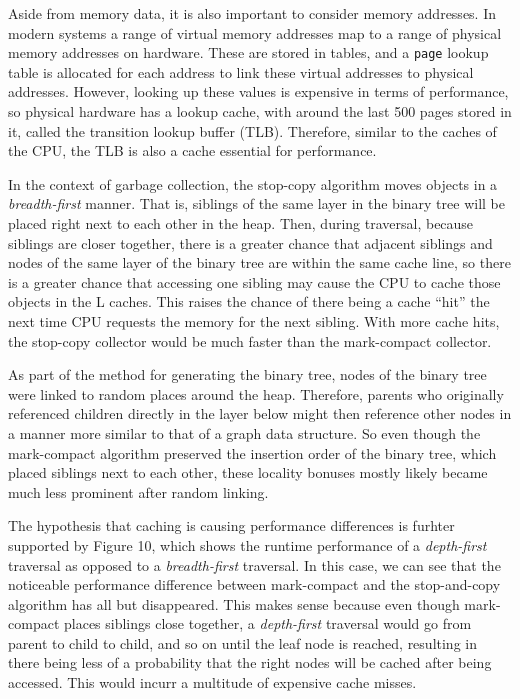 \documentclass[index]{subfiles}
\begin{document}
Aside from memory data, it is also important to consider memory addresses. In modern systems a range of virtual memory addresses map to a range of physical memory addresses on hardware\cites{code_project}[31:29]{oracledevelopersCachingUnderstandMeasure2015}. These are stored in tables, and a \verb+page+ lookup table is allocated for each address to link these virtual addresses to physical addresses. However, looking up these values is expensive in terms of performance, so physical hardware has a lookup cache, with around the last 500 pages stored in it, called the transition lookup buffer (TLB)\cites{code_project}[32:42]{oracledevelopersCachingUnderstandMeasure2015}. Therefore, similar to the caches of the CPU, the TLB is also a cache essential for performance.

In the context of garbage collection, the stop-copy algorithm moves objects in a \textit{breadth-first} manner. That is, siblings of the same layer in the binary tree will be placed right next to each other in the heap. Then, during traversal, because siblings are closer together, there is a greater chance that adjacent siblings and nodes of the same layer of the binary tree are within the same cache line, so there is a greater chance that accessing one sibling may cause the CPU to cache those objects in the L caches. This raises the chance of there being a cache ``hit'' the next time CPU requests the memory for the next sibling. With more cache hits, the stop-copy collector would be much faster than the mark-compact collector. %

As part of the method for generating the binary tree, nodes of the binary tree were linked to random places around the heap. Therefore, parents who originally referenced children directly in the layer below might then reference other nodes in a manner more similar to that of a graph data structure. So even though the mark-compact algorithm preserved the insertion order of the binary tree, which placed siblings next to each other, these locality bonuses mostly likely became much less prominent after random linking.

The hypothesis that caching is causing performance differences is furhter supported by Figure 10, which shows the runtime performance of a \textit{depth-first} traversal as opposed to a \textit{breadth-first} traversal. In this case, we can see that the noticeable performance difference between mark-compact and the stop-and-copy algorithm has all but disappeared. This makes sense because even though mark-compact places siblings close together, a \textit{depth-first} traversal would go from parent to child to child, and so on until the leaf node is reached, resulting in there being less of a probability that the right nodes will be cached after being accessed. This would incurr a multitude of expensive cache misses.
\end{document}
